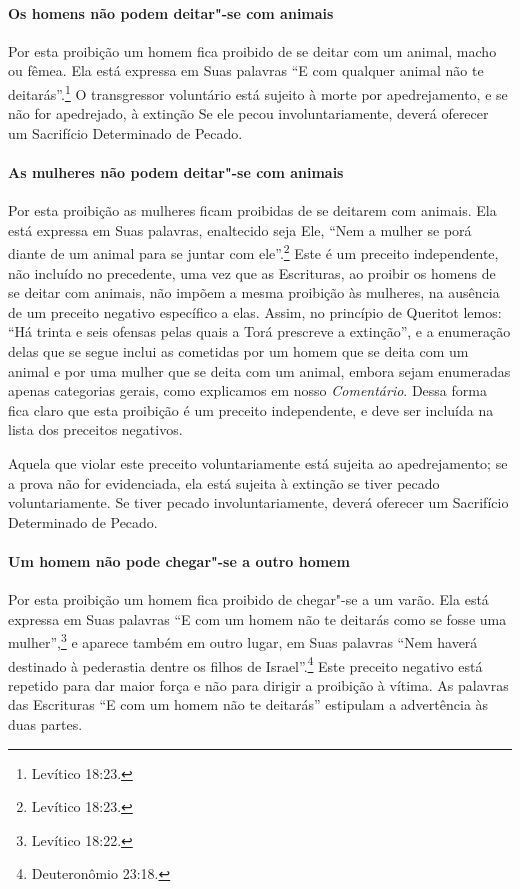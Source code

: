 \begin{multicols}{2}
\paragraph{Os homens não podem deitar"-se com animais}

Por esta proibição um homem fica proibido de se deitar com um animal,
macho ou fêmea. Ela está expressa em Suas palavras ``E com qualquer
animal não te deitarás''.\footnote{Levítico 18:23.} O transgressor voluntário
está sujeito à morte por apedrejamento, e se não for apedrejado, à
extinção Se ele pecou involuntariamente, deverá oferecer um Sacrifício
Determinado de Pecado.

\paragraph{As mulheres não podem deitar"-se com animais}

Por esta proibição as mulheres ficam proibidas de se deitarem com
animais. Ela está expressa em Suas palavras, enaltecido seja Ele, ``Nem
a mulher se porá diante de um animal para se juntar com ele''.\footnote{Levítico
18:23.} Este é um preceito independente, não incluído no precedente, uma
vez que as Escrituras, ao proibir os homens de se deitar com animais,
não impõem a mesma proibição às mulheres, na ausência de um preceito
negativo específico a elas. Assim, no princípio de Queritot\starr{} lemos: ``Há
trinta e seis ofensas pelas quais a Torá\starr{} prescreve a extinção'', e a
enumeração delas que se segue inclui as cometidas por um homem que se
deita com um animal e por uma mulher que se deita com um animal, embora
sejam enumeradas apenas categorias gerais, como explicamos em nosso
\emph{Comentário}. Dessa forma fica claro que esta proibição é um preceito
independente, e deve ser incluída na lista dos preceitos negativos.

Aquela que violar este preceito voluntariamente está sujeita ao
apedrejamento; se a prova não for evidenciada, ela está sujeita à
extinção se tiver pecado voluntariamente. Se tiver pecado
involuntariamente, deverá oferecer um Sacrifício Determinado de Pecado.

\paragraph{Um homem não pode chegar"-se a outro homem}

Por esta proibição um homem fica proibido de chegar"-se a um varão. Ela
está expressa em Suas palavras ``E com um homem não te deitarás como se
fosse uma mulher'',\footnote{Levítico 18:22.} e aparece também em outro lugar, em
Suas palavras ``Nem haverá destinado à pederastia dentre os filhos de
Israel''.\footnote{Deuteronômio 23:18.} Este preceito negativo está repetido
para dar maior força e não para dirigir a proibição à vítima. As
palavras das Escrituras ``E com um homem não te deitarás'' estipulam a
advertência às duas partes.


\end{multicols}
